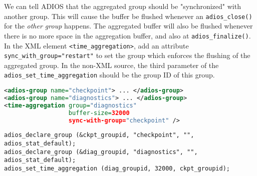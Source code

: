 We can tell ADIOS that the aggregated group should be "synchronized" with another group. This will cause the buffer be flushed whenever an \verb+adios_close()+ for the {\em other group}  happens. The aggregated buffer will also be flushed whenever there is no more space in the aggregation buffer, and also at \verb+adios_finalize()+. In the XML element \verb+<time_aggregation>+, add an attribute \verb+sync_with_group="restart"+ to set the group which enforces the flushing of the aggregated group. In the non-XML source, the third parameter of the \verb+adios_set_time_aggregation+ should be the group ID of this group. 


\begin{lstlisting}[language=XML,caption=Set time aggregation for a group in XML with a synchronizing group]
<adios-group name="checkpoint"> ... </adios-group>
<adios-group name="diagnostics"> ... </adios-group>
<time-aggregation group="diagnostics" 
                  buffer-size=32000 
                  sync-with-group="checkpoint" />
\end{lstlisting}


\begin{lstlisting}[caption=Set time aggregation for a group in source code with a synchronizing group]
adios_declare_group (&ckpt_groupid, "checkpoint", "", adios_stat_default);
adios_declare_group (&diag_groupid, "diagnostics", "", adios_stat_default);
adios_set_time_aggregation (diag_groupid, 32000, ckpt_groupid);
\end{lstlisting}



